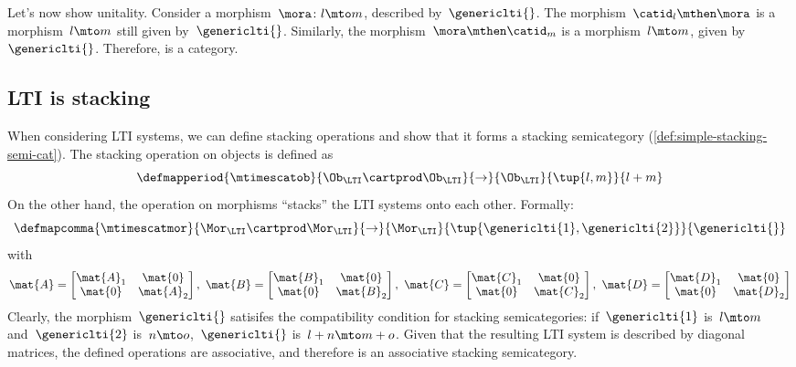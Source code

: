 \begin{solution}
    Let's now show unitality.
    Consider a morphism~$\mora\colon l\mto m$, described by~$\genericlti{}$.
    The morphism~$\catid_l \mthen \mora$ is a morphism~$l\mto m$ still given by~$\genericlti{}$.
    Similarly, the morphism~$\mora\mthen \catid_m$ is a morphism~$l\mto m$, given by~$\genericlti{}$.
    Therefore, \LTI is a category.
\end{solution}

\subsection{LTI is stacking}
When considering LTI systems, we can define stacking operations and show that it forms a stacking semicategory (\cref{def:simple-stacking-semi-cat}).
The stacking operation on objects is defined as
\begin{equation*}
    \defmapperiod{\mtimescatob}{\Ob_\LTI \cartprod \Ob_\LTI}{\to}{\Ob_\LTI}{\tup{l,m}}{l+m}
\end{equation*}
On the other hand, the operation on morphisms ``stacks'' the LTI systems onto each other.
Formally:
\begin{equation*}
    \defmapcomma{\mtimescatmor}{\Mor_\LTI \cartprod \Mor_\LTI}{\to}{\Mor_\LTI}{\tup{\genericlti{1},\genericlti{2}}}{\genericlti{}}
\end{equation*}
with
\begin{equation*}
    \mat{A}=\begin{bmatrix}
    \mat{A}_1&\mat{0}\\
    \mat{0}&\mat{A}_2    
    \end{bmatrix}, \ 
    \mat{B}=\begin{bmatrix}
    \mat{B}_1&\mat{0}\\
    \mat{0}&\mat{B}_2    
    \end{bmatrix},\
    \mat{C}=\begin{bmatrix}
    \mat{C}_1&\mat{0}\\
    \mat{0}&\mat{C}_2
    \end{bmatrix},\
    \mat{D}=\begin{bmatrix}
    \mat{D}_1&\mat{0}\\
    \mat{0}&\mat{D}_2
    \end{bmatrix}           
\end{equation*}   
Clearly, the morphism~$\genericlti{}$ satisifes the compatibility condition for stacking semicategories: if~$\genericlti{1}$ is~$l\mto m$ and~$\genericlti{2}$ is~$n\mto o$,~$\genericlti{}$ is~$l+n\mto m+o$.
Given that the resulting LTI system is described by diagonal matrices, the defined operations are associative, and therefore \LTI is an associative stacking semicategory.

